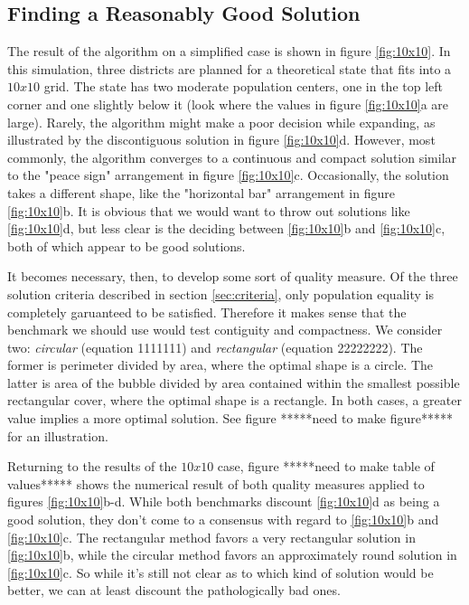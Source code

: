 \documentclass[11pt]{article}				%
\begin{document}
	\subsection{Finding a Reasonably Good Solution}

The result of the algorithm on a simplified case is shown in figure
\ref{fig:10x10}. In this simulation, three districts are planned for a
theoretical state that fits into a $10 x 10$ grid. The state has two
moderate population centers, one in the top left corner and one slightly
below it (look where the values in figure \ref{fig:10x10}a are large).
Rarely, the algorithm might make a poor decision while expanding, as
illustrated by the discontiguous solution in figure \ref{fig:10x10}d.
However, most commonly, the algorithm converges to a continuous and
compact solution similar to the "peace sign" arrangement in figure
\ref{fig:10x10}c. Occasionally, the solution takes a different shape,
like the "horizontal bar" arrangement in figure \ref{fig:10x10}b. It is
obvious that we would want to throw out solutions like \ref{fig:10x10}d,
but less clear is the deciding between \ref{fig:10x10}b and
\ref{fig:10x10}c, both of which appear to be good solutions.

It becomes necessary, then, to develop some sort of quality measure. Of
the three solution criteria described in section \ref{sec:criteria}, only 
population equality is completely garuanteed to be satisfied. Therefore
it makes sense that the benchmark we should use would test contiguity and 
compactness. We consider two: \textit{circular} (equation 1111111) and
\textit{rectangular} (equation 22222222). The former is perimeter divided by
area, where the optimal shape is a circle. The latter is area of the
bubble divided by area contained within the smallest possible rectangular 
cover, where the optimal shape is a rectangle. In both cases, a greater
value implies a more optimal solution. See figure *****need to make
figure***** for an illustration.  

Returning to the results of the $10 x 10$ case, figure *****need to make
table of values***** shows the numerical result of both quality measures
applied to figures \ref{fig:10x10}b-d. While both benchmarks discount
\ref{fig:10x10}d as being a good solution, they don't come to a consensus 
with regard to \ref{fig:10x10}b and \ref{fig:10x10}c. The rectangular
method favors a very rectangular solution in \ref{fig:10x10}b, while the
circular method favors an approximately round solution in
\ref{fig:10x10}c. So while it's still not clear as to which kind of
solution would be better, we can at least discount the pathologically bad 
ones.
\end{document}
